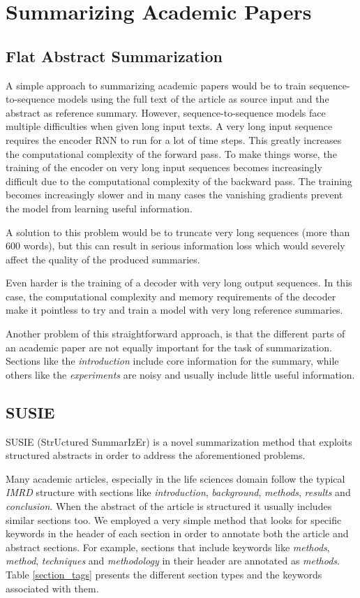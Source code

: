 \documentclass[runningheads]{llncs}
\begin{document}
\section{Summarizing Academic Papers}
\subsection{Flat Abstract Summarization}
\label{sec:flat_sum}

A simple approach to summarizing academic papers would be to train sequence-to-sequence models using the full text of the article as source input and the abstract as reference summary. However, sequence-to-sequence models face multiple difficulties when given long input texts. A very long input sequence requires the encoder RNN to run for a lot of time steps. This greatly increases the computational complexity of the forward pass. To make things worse, the training of the encoder on very long input sequences becomes increasingly difficult due to the computational complexity of the backward pass. The training becomes increasingly slower and in many cases the vanishing gradients prevent the model from learning useful information.

A solution to this problem would be to truncate very long sequences (more than 600 words), but this can result in serious information loss which would severely affect the quality of the produced summaries.

Even harder is the training of a decoder with very long output sequences. In this case, the computational complexity and memory requirements of the decoder make it pointless to try and train a model with very long reference summaries.

Another problem of this straightforward approach, is that the different parts of an academic paper are not equally important for the task of summarization. Sections like the {\em introduction} include core information for the summary, while others like the {\em experiments} are noisy and usually include little useful information.

\subsection{SUSIE}
\label{sec:susie}

SUSIE (StrUctured SummarIzEr) is a novel summarization method that exploits structured abstracts in order to address the aforementioned problems. 

Many academic articles, especially in the life sciences domain follow the typical {\em IMRD} structure with sections like {\em introduction}, {\em background}, {\em methods}, {\em results} and {\em  conclusion}. When the abstract of the article is structured it usually  includes similar sections too. We employed a very simple method that looks for specific keywords in the header of each section in order to annotate both the article and abstract sections. For example, sections that include keywords like {\em methods}, {\em method}, {\em techniques} and {\em methodology} in their header are annotated as \textit{methods}. Table \ref{section_tags} presents the different section types and the keywords associated with them. 
\end{document}
